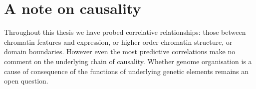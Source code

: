 \documentclass[a4paper,11pt,oneside]{book}
\begin{document}

\section{A note on causality}


Throughout this thesis we have probed correlative relationships: those between chromatin features and expression, or higher order chromatin structure, or domain boundaries. However even the most predictive correlations make no comment on the underlying chain of causality. Whether genome organisation is a cause of consequence of the functions of underlying genetic elements remains an open question.\cite{Sexton2015}

\end{document}
